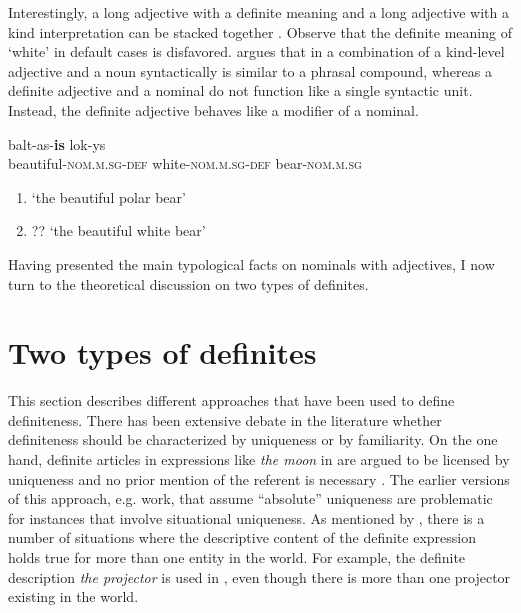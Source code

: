 \documentclass[output=paper,
modfonts
]{langscibook}
\begin{document}
Interestingly, a long adjective with a definite meaning and a long adjective with a kind interpretation can be stacked together . Observe that the definite meaning of `white' in default cases is disfavored. \citet{Sereikaite2017} argues that in  a combination of a kind-level adjective and a noun syntactically is similar to a phrasal compound, whereas a definite adjective and a nominal do not function like a single syntactic unit. Instead, the definite adjective behaves like a modifier of a nominal. 

\begin{exe}
\ex \label{ex:sereikaite:12}
 {balt-as-\textbf{is}} {lok-ys} \\
beautiful-\textsc{nom.m.sg}-{\textsc{def}} white-\textsc{nom.m.sg}-{\textsc{def}} bear-\textsc{nom.m.sg} \\
\trans 
\begin{enumerate}[label=(\roman*)]
	\item `the beautiful polar bear'\\
	\item ?? `the beautiful white bear' 
\end{enumerate}
\end{exe}



Having presented the main typological facts on nominals with adjectives, I now turn to the theoretical discussion on two types of definites.


\section{Two types of definites} \label{sec:sereikaite:3}

This section describes different approaches that have been used to define definiteness. There has been extensive debate in the literature whether definiteness should be characterized by uniqueness or by familiarity. On the one hand, definite articles in expressions like \textit{the moon} in  are argued to be licensed by uniqueness and no prior mention of the referent is necessary \citep{Russell1905,Strawson1950,Frege1892}. The earlier versions of this approach, e.g.  work, that assume ``absolute'' uniqueness are problematic for instances that involve situational uniqueness. As mentioned by \citet{Schwarz2013}, there is a number of situations where the descriptive content of the definite expression holds true for more than one entity in the world. For example, the definite description \textit{the projector} is used in , even though there is more than one projector existing in the world. 
\end{document}
